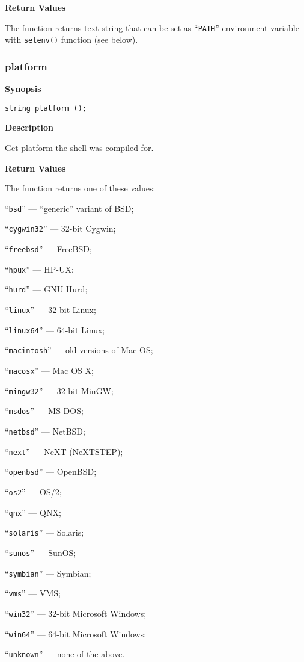 \documentclass[a4paper, 10pt, titlepage]{article}
\begin{document}
\textbf{Return Values}

The function returns text string that can be set as ``\texttt{PATH}'' environment variable with \texttt{setenv()} function (see below).

\subsubsection{platform}

\textbf{Synopsis}

\begin{verbatim}
string platform ();
\end{verbatim}

\textbf{Description}

Get platform the shell was compiled for.

\textbf{Return Values}

The function returns one of these values:
\begin{itemize*}
\item ``\texttt{bsd}'' --- ``generic'' variant of BSD;
\item ``\texttt{cygwin32}'' --- 32-bit Cygwin;
\item ``\texttt{freebsd}'' --- FreeBSD;
\item ``\texttt{hpux}'' --- HP-UX;
\item ``\texttt{hurd}'' --- GNU Hurd;
\item ``\texttt{linux}'' --- 32-bit Linux;
\item ``\texttt{linux64}'' --- 64-bit Linux;
\item ``\texttt{macintosh}'' --- old versions of Mac OS;
\item ``\texttt{macosx}'' --- Mac OS X;
\item ``\texttt{mingw32}'' --- 32-bit MinGW;
\item ``\texttt{msdos}'' --- MS-DOS;
\item ``\texttt{netbsd}'' --- NetBSD;
\item ``\texttt{next}'' --- NeXT (NeXTSTEP);
\item ``\texttt{openbsd}'' --- OpenBSD;
\item ``\texttt{os2}'' --- OS/2;
\item ``\texttt{qnx}'' --- QNX;
\item ``\texttt{solaris}'' --- Solaris;
\item ``\texttt{sunos}'' --- SunOS;
\item ``\texttt{symbian}'' --- Symbian;
\item ``\texttt{vms}'' --- VMS;
\item ``\texttt{win32}'' --- 32-bit Microsoft Windows;
\item ``\texttt{win64}'' --- 64-bit Microsoft Windows;
\item ``\texttt{unknown}'' --- none of the above.
\end{itemize*}
\end{document}
